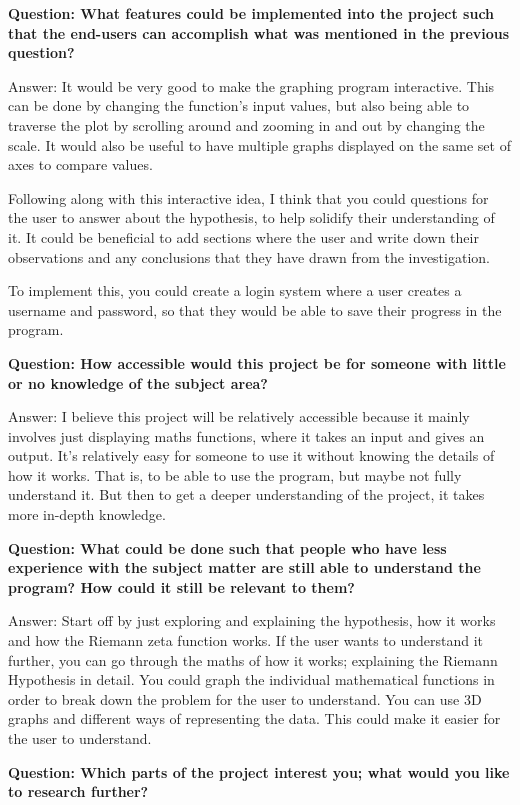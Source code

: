 \documentclass{article}
\begin{document}
\textbf{Question: What features could be implemented into the project such that the end-users can accomplish what was mentioned in the previous question?}

Answer: It would be very good to make the graphing program interactive. This can be done by changing the function’s input values, but also being able to traverse the plot by scrolling around and zooming in and out by changing the scale. It would also be useful to have multiple graphs displayed on the same set of axes to compare values.

Following along with this interactive idea, I think that you could questions for the user to answer about the hypothesis, to help solidify their understanding of it. It could be beneficial to add sections where the user and write down their observations and any conclusions that they have drawn from the investigation.

To implement this, you could create a login system where a user creates a username and password, so that they would be able to save their progress in the program.

\textbf{Question: How accessible would this project be for someone with little or no knowledge of the subject area?}

Answer: I believe this project will be relatively accessible because it mainly involves just displaying maths functions, where it takes an input and gives an output. It's relatively easy for someone to use it without knowing the details of how it works. That is, to be able to use the program, but maybe not fully understand it. But then to get a deeper understanding of the project, it takes more in-depth knowledge.

\textbf{Question: What could be done such that people who have less experience with the subject matter are still able to understand the program? How could it still be relevant to them?}

Answer: Start off by just exploring and explaining the hypothesis, how it works and how the Riemann zeta function works. If the user wants to understand it further, you can go through the maths of how it works; explaining the Riemann Hypothesis in detail. You could graph the individual mathematical functions in order to break down the problem for the user to understand.  You can use 3D graphs and different ways of representing the data. This could make it easier for the user to understand.

\textbf{Question: Which parts of the project interest you; what would you like to research further?}
\end{document}
